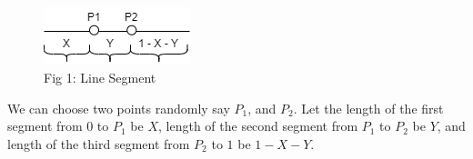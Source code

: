\documentclass[journal,12pt,twocolumn]{IEEEtran}
\begin{document}
\subsection*{}
\begin{figure}[h!]
    \includegraphics[width=\columnwidth]{Challenge-Problem/9/Figure/LineSeq2.png}
    \centering \caption*{Fig 1: Line Segment}
\end{figure}
We can choose two points randomly say $P_1$, and $P_2$. Let the length of the first segment from 0 to $P_1$ be $X$, length of the second segment from $P_1$ to $P_2$ be $Y$, and length of the third segment from $P_2$ to $1$ be $1-X-Y$.
\end{document}
